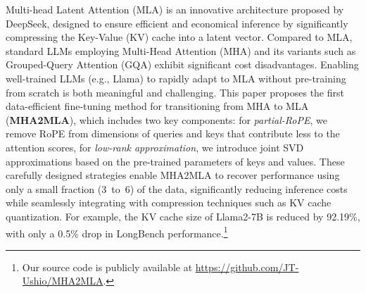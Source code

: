Multi-head Latent Attention (MLA) is an innovative architecture proposed by DeepSeek, 
designed to ensure efficient and economical inference by significantly compressing the Key-Value (KV) cache into a latent vector.
Compared to MLA, standard LLMs employing Multi-Head Attention (MHA) and its variants such as Grouped-Query Attention (GQA) exhibit significant cost disadvantages.
Enabling well-trained LLMs (e.g., Llama) to rapidly adapt to MLA without pre-training from scratch is both meaningful and challenging.
This paper proposes the first data-efficient fine-tuning method for transitioning from MHA to MLA (\textbf{MHA2MLA}), which includes two key components: 
for \textit{partial-RoPE}, we remove RoPE from dimensions of queries and keys that contribute less to the attention scores,  
for \textit{low-rank approximation}, we introduce joint SVD approximations based on the pre-trained parameters of keys and values. 
These carefully designed strategies enable MHA2MLA to recover performance using only a small fraction (3\textperthousand~to~6\textperthousand) of the data, significantly reducing inference costs while seamlessly integrating with compression techniques such as KV cache quantization. For example, the KV cache size of Llama2-7B is reduced by 92.19\%, with only a 0.5\% drop in LongBench performance.\footnote{
Our source code is publicly available at \url{https://github.com/JT-Ushio/MHA2MLA}.
}